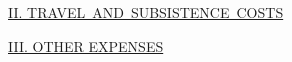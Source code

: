 \documentclass[12pt,letterpaper]{article}
\begin{document}
\bigskip

\noindent \underline{II. TRAVEL\ AND\ SUBSISTENCE\ COSTS}\smallskip


\bigskip

\noindent \underline{III. OTHER EXPENSES}\smallskip


\bigskip


 
\end{document}
